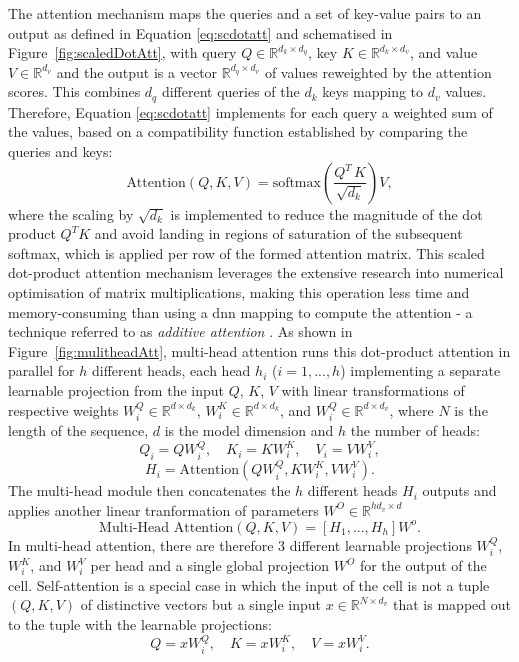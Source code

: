 The attention mechanism maps the queries and a set of key-value pairs to an output as defined in Equation \ref{eq:scdotatt} and schematised in Figure~\ref{fig:scaledDotAtt}, with query $Q \in \mathbb{R}^{d_k \times d_q}$, key $K \in \mathbb{R}^{d_k \times d_v}$, and value $V \in \mathbb{R}^{d_v}$ and the output is a vector $\mathbb{R}^{d_q \times d_v}$ of values reweighted by the attention scores. This combines $d_q$ different queries of the $d_k$ keys mapping to $d_v$ values. Therefore, Equation \ref{eq:scdotatt} implements for each query a weighted sum of the values, based on a compatibility function established by comparing the queries and keys:
\begin{equation}\label{eq:scdotatt}
    \text{Attention}(Q, K, V) = \text{softmax}\left( \frac{Q^T \, K}{\sqrt{d_k}}\right) V,
\end{equation} 
where the scaling by $\sqrt{d_k}$ is implemented to reduce the magnitude of the dot product $Q^T K$ and avoid landing in regions of saturation of the subsequent softmax, which is applied per row of the formed attention matrix. This scaled dot-product attention mechanism leverages the extensive research into numerical optimisation of matrix multiplications, making this operation less time and memory-consuming than using a \gls{dnn} mapping to compute the attention - a technique referred to as \textit{additive attention} \cite{Bahdanau2014NeuralMT}. As shown in Figure~\ref{fig:mulitheadAtt}, multi-head attention runs this dot-product attention in parallel for $h$ different heads, each head $h_i$ ($i = 1, ..., h$) implementing a separate learnable projection from the input $Q$, $K$, $V$ with linear transformations of respective weights $W_i^Q \in \mathbb{R}^{d \times d_k}$, $W_i^K \in \mathbb{R}^{d \times d_k}$, and $W_i^Q \in \mathbb{R}^{d \times d_v}$, where $N$ is the length of the sequence, $d$ is the model dimension and $h$ the number of heads: \[Q_i = Q W_i^Q, \quad K_i = K W_i^K, \quad V_i = V W_i^V,\] \[H_i = \text{Attention}(QW_i^Q, KW_i^K, VW_i^V).\] The multi-head module then concatenates the $h$ different heads $H_i$ outputs and applies another linear tranformation of parameters $W^O \in \mathbb{R}^{hd_v \times d}$ \[\text{Multi-Head Attention}(Q, K, V) = \left[H_1, ..., H_h\right]W^o .\] In multi-head attention, there are therefore 3 different learnable projections $W_i^Q$, $W_i^K$, and $W_i^V$ per head and a single global projection $W^O$ for the output of the cell. Self-attention is a special case in which the input of the cell is not a tuple $(Q, K, V)$ of distinctive vectors but a single input $x \in \mathbb{R}^{N \times d_v}$ that is mapped out to the tuple with the learnable projections: \[Q = xW_i^Q, \quad K = xW_i^K, \quad V = xW_i^V.\]

